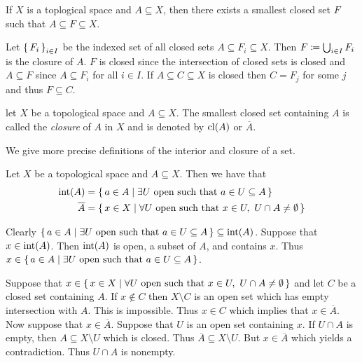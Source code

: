 \documentclass[letterpaper, 11pt, oneside]{book}
\begin{document}
\begin{prop}
  If $X$ is a toplogical space and $A \subseteq X$, then there exists a smallest closed set $F$ such that $A \subseteq F \subseteq X$.
\end{prop}
\begin{pf}
  Let $\set{F_{i}}_{i \in I}$ be the indexed set of all closed sets $A \subseteq F_{i} \subseteq X$.
  Then $F \coloneqq \bigcup_{i \in I} F_{i}$ is the closure of $A$.
  $F$ is closed since the intersection of closed sets is closed and $A \subseteq F$ since $A \subseteq F_{i}$ for all $i \in I$.
  If $A \subseteq C \subseteq X$ is closed then $C = F_{j}$ for some $j$ and thus $F \subseteq C$.
\end{pf}
\begin{defn}[Closure]
  let $X$ be a topological space and $A \subseteq X$.
  The smallest closed set containing $A$ is called the \emph{closure} of $A$ in $X$ and is denoted by $\operatorname{cl}(A)$ or $\overline{A}$.
\end{defn}

We give more precise definitions of the interior and closure of a set.

\begin{prop}\label{prop: defn_of_int_and_cl}
  Let $X$ be a topological space and $A \subseteq X$.
  Then we have that
  \begin{align*}
    \operatorname{int}(A) &= \set{a \in A | \exists U \text{ open such that } a \in U \subseteq A} \\
    \overline{A} &= \set{x \in X | \forall U \text{ open such that } x \in U,~ U \cap A \neq \emptyset}
  \end{align*}
\end{prop}
\begin{pf}
  Clearly $\set{a \in A | \exists U \text{ open such that } a \in U \subseteq A} \subseteq \operatorname{int}(A)$.
  Suppose that $x \in \operatorname{int}(A)$.
  Then $\operatorname{int}(A)$ is open, a subset of $A$, and contains $x$.
  Thus $x \in \set{a \in A | \exists U \text{ open such that } a \in U \subseteq A}$.

  Suppose that $x \in \set{x \in X | \forall U \text{ open such that } x \in U,~ U \cap A \neq \emptyset}$ and let $C$ be a closed set containing $A$.
  If $x \notin C$ then $X \setminus C$ is an open set which has empty intersection with $A$.
  This is impossible.
  Thus $x \in C$ which implies that $x \in \overline{A}$.
  Now suppose that $x \in \overline{A}$.
  Suppose that $U$ is an open set containing $x$.
  If $U \cap A$ is empty, then $A \subseteq X \setminus U$ which is closed.
  Thus $\overline{A} \subseteq X \setminus U$.
  But $x \in \overline{A}$ which yields a contradiction.
  Thus $U \cap A$ is nonempty.
\end{pf}
\end{document}
